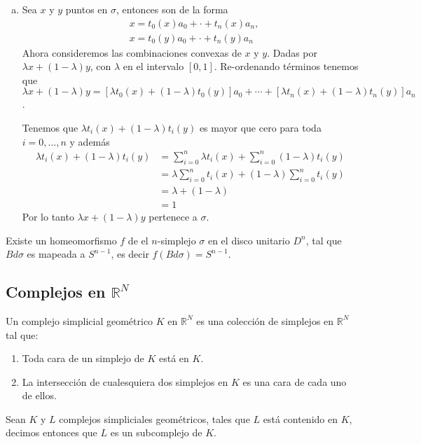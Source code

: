 \begin{Dem}
\begin{enumerate}[(a)]
\item Sea $x$ y $y$ puntos en $\sigma$, entonces son de la forma
\begin{align*}
&x = t_0(x)a_0+\cdot +t_n(x)a_n ,\\
&x = t_0(y)a_0+\cdot +t_n(y)a_n
\end{align*}
Ahora consideremos las combinaciones convexas de $x$ y $y$. Dadas por 
$\lambda x + (1-\lambda)y$, con $\lambda$ en el intervalo $[0,1]$. 
Re-ordenando términos tenemos que
$\lambda x + (1-\lambda)y = [\lambda t_0(x)+(1-\lambda)t_0(y)]a_0+\cdots + [\lambda t_n(x)+(1-\lambda)t_n(y)]a_n$. 

Tenemos que $\lambda t_i(x)+(1-\lambda)t_i(y)$ es mayor que cero para toda $i = 0,\ldots ,n$ y además
\begin{align*}
\lambda t_i(x)+(1-\lambda)t_i(y)&=  \sum_{i=0}^{n}\lambda t_i(x)+\sum_{i=0}^{n}(1-\lambda)t_i(y) \\
&= \lambda\sum_{i=0}^{n}t_i(x)+(1-\lambda)\sum_{i=0}^{n}t_i(y)\\ 
&= \lambda + (1-\lambda)\\
& = 1
\end{align*}
Por lo tanto $\lambda x + (1-\lambda)y$ pertenece a $\sigma$.
 


\end{enumerate}
\end{Dem}
\begin{Teo}
\item Existe un homeomorfismo $f$ de el $n$-simplejo $\sigma$ en el disco unitario $D^n$, tal que $Bd\sigma$ es mapeada a $S^{n-1}$, es decir $f(Bd\sigma) = S^{n-1}$.
\end{Teo}

\subsection{Complejos en $\mathbb{R}^N$}
\begin{Defi}
Un complejo simplicial geométrico $\textit{K}$ en $\mathbb{R}^N$  es una colección de simplejos en $\mathbb{R}^N$ tal que:
\begin{enumerate}
\item Toda cara de un simplejo de $\textit{K}$ está en $\textit{K}$.
\item La intersección de cualesquiera dos simplejos en $\textit{K}$ es una cara de cada uno de ellos.
\end{enumerate} 
\end{Defi}
\begin{Defi}
Sean $\textit{K}$ y $\textit{L}$ complejos simpliciales geométricos, tales que $\textit{L}$ está contenido en $\textit{K}$, decimos entonces que $\textit{L}$ es un subcomplejo de $\textit{K}$. 
\end{Defi}

